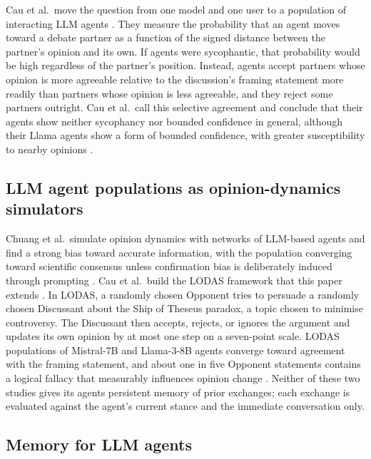 \documentclass[11pt,a4paper]{article}
\begin{document}
Cau et al.\ move the question from one model and one user to a population of interacting LLM agents \citep{cau2025selective}. They measure the probability that an agent moves toward a debate partner as a function of the signed distance between the partner's opinion and its own. If agents were sycophantic, that probability would be high regardless of the partner's position. Instead, agents accept partners whose opinion is more agreeable relative to the discussion's framing statement more readily than partners whose opinion is less agreeable, and they reject some partners outright. Cau et al.\ call this selective agreement and conclude that their agents show neither sycophancy nor bounded confidence in general, although their Llama agents show a form of bounded confidence, with greater susceptibility to nearby opinions \citep{cau2025selective}.

\subsection{LLM agent populations as opinion-dynamics simulators}\label{sec:2.3}

Chuang et al.\ simulate opinion dynamics with networks of LLM-based agents and find a strong bias toward accurate information, with the population converging toward scientific consensus unless confirmation bias is deliberately induced through prompting \citep{chuang2024simulating}. Cau et al.\ build the LODAS framework that this paper extends \citep{cau2025selective}. In LODAS, a randomly chosen Opponent tries to persuade a randomly chosen Discussant about the Ship of Theseus paradox, a topic chosen to minimise controversy. The Discussant then accepts, rejects, or ignores the argument and updates its own opinion by at most one step on a seven-point scale. LODAS populations of Mistral-7B and Llama-3-8B agents converge toward agreement with the framing statement, and about one in five Opponent statements contains a logical fallacy that measurably influences opinion change \citep{cau2025selective}. Neither of these two studies gives its agents persistent memory of prior exchanges; each exchange is evaluated against the agent's current stance and the immediate conversation only.

\subsection{Memory for LLM agents}\label{sec:2.4}
\end{document}
